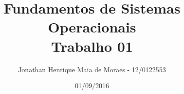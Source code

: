 \title{Fundamentos de Sistemas Operacionais \\ Trabalho 01}
\author{Jonathan Henrique Maia de Moraes - 12/0122553}
\date{01/09/2016}
\maketitle
